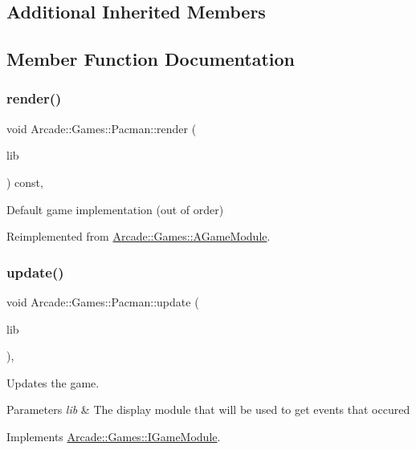 \subsection*{Additional Inherited Members}


\subsection{Member Function Documentation}
\mbox{\label{classArcade_1_1Games_1_1Pacman_ab1a7408f265efbef12b4f9d1a6fb4512}} 
\subsubsection{\texorpdfstring{render()}{render()}}
{\footnotesize\ttfamily void Arcade\+::\+Games\+::\+Pacman\+::render (\begin{DoxyParamCaption}\item[{\mbox{\hyperlink{classArcade_1_1Display_1_1IDisplayModule}{Arcade\+::\+Display\+::\+I\+Display\+Module}} \&}]{lib }\end{DoxyParamCaption}) const\hspace{0.3cm}{\ttfamily [final]}, {\ttfamily [virtual]}}

Default game implementation (out of order) 

Reimplemented from \mbox{\hyperlink{classArcade_1_1Games_1_1AGameModule_a5897780d42d5faba3287c29b87f2b498}{Arcade\+::\+Games\+::\+A\+Game\+Module}}.

\mbox{\label{classArcade_1_1Games_1_1Pacman_aa6bc227c3f14cc8d66d11f2d32bed3ec}} 
\subsubsection{\texorpdfstring{update()}{update()}}
{\footnotesize\ttfamily void Arcade\+::\+Games\+::\+Pacman\+::update (\begin{DoxyParamCaption}\item[{const \mbox{\hyperlink{classArcade_1_1Display_1_1IDisplayModule}{Arcade\+::\+Display\+::\+I\+Display\+Module}} \&}]{lib }\end{DoxyParamCaption})\hspace{0.3cm}{\ttfamily [final]}, {\ttfamily [virtual]}}



Updates the game. 


\begin{DoxyParams}{Parameters}
{\em lib} & The display module that will be used to get events that occured \\
\hline
\end{DoxyParams}


Implements \mbox{\hyperlink{classArcade_1_1Games_1_1IGameModule_a421d1064fcc112dfc7ea025fc7f88aa7}{Arcade\+::\+Games\+::\+I\+Game\+Module}}.

